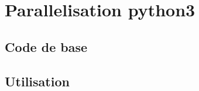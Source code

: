 \chapter{Parallelisation python3}
\label{ch:parallel}

\section{Code de base}
\section{Utilisation}
